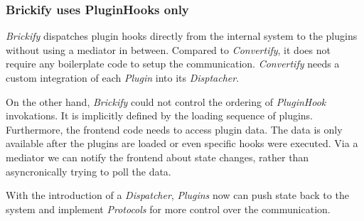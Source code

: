 \documentclass[../ClassicThesis.tex]{subfiles}
\begin{document}
\subsubsection{Brickify uses PluginHooks only}

\emph{Brickify} dispatches plugin hooks directly from the internal system to the
plugins without using a mediator in between. Compared to \emph{Convertify}, it
does not require any boilerplate code to setup the communication.
\emph{Convertify} needs a custom integration of each \emph{Plugin} into its
\emph{Disptacher}.

On the other hand, \emph{Brickify} could not control the ordering of
\emph{PluginHook} invokations. It is implicitly defined by the loading sequence
of plugins. Furthermore, the frontend code needs to access plugin data. The data
is only available after the plugins are loaded or even specific hooks were
executed. Via a mediator we can notify the frontend about state changes, rather
than asyncronically trying to poll the data.

With the introduction of a \emph{Dispatcher}, \emph{Plugins} now can push state
back to the system and implement \emph{Protocols} for more control over the
communication.



\end{document}
